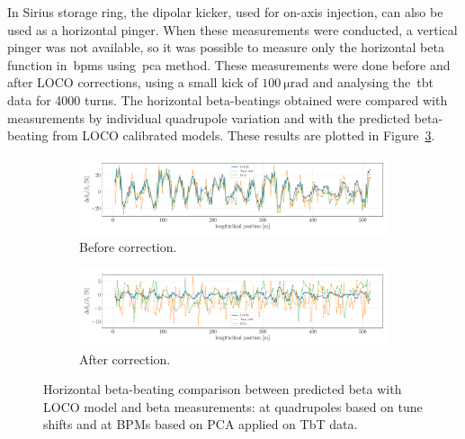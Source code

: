 In Sirius storage ring, the dipolar kicker, used for on-axis injection, can also be used as a horizontal pinger. When these measurements were conducted, a vertical pinger was not available, so it was possible to measure only the horizontal beta function in~\glspl{bpm} using~\gls{pca} method. These measurements were done before and after LOCO corrections, using a small kick of $\SI{100}{\micro\radian}$ and analysing the~\gls{tbt} data for 4000 turns. The horizontal beta-beatings obtained were compared with measurements by individual quadrupole variation and with the predicted beta-beating from LOCO calibrated models. These results are plotted in Figure~\ref{fig:betax_compare}.
\begin{figure}
\centering
\begin{subfigure}[t]{1.0\textwidth}
\includegraphics[width=1.0\textwidth]{figures/betax_compare_loco_pca_quad_before_corr.pdf}
    \caption{Before correction.}
    \label{subfig:betax_compare_before}
\end{subfigure}
 \begin{subfigure}[t]{1.0\textwidth}
\includegraphics[width=1.0\textwidth]{figures/betax_compare_loco_pca_quad_after_corr.pdf}
    \caption{After correction.}
    \label{subfig:betax_compare_after}
\end{subfigure}
\caption{Horizontal beta-beating comparison between predicted beta with LOCO model and beta measurements: at quadrupoles based on tune shifts and at BPMs based on PCA applied on TbT data.}
\label{fig:betax_compare}
\end{figure}

